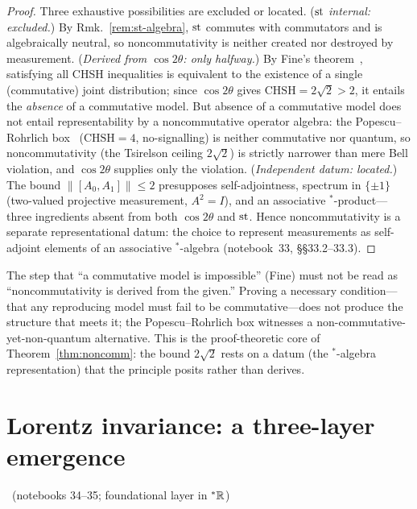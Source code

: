 \documentclass[11pt]{article}
\begin{document}
\begin{proof}
Three exhaustive possibilities are excluded or located. (\emph{$\operatorname{st}$ internal: excluded.}) By
Rmk.~\ref{rem:st-algebra}, $\operatorname{st}$ commutes with commutators and is algebraically neutral, so
noncommutativity is neither created nor destroyed by measurement. (\emph{Derived from
$\cos2\theta$: only halfway.}) By Fine's theorem~\cite{fine}, satisfying all CHSH inequalities is equivalent
to the existence of a single (commutative) joint distribution; since $\cos2\theta$ gives
$\text{CHSH}=2\sqrt2>2$, it entails the \emph{absence} of a commutative model. But absence of a
commutative model does not entail representability by a noncommutative operator algebra: the
Popescu--Rohrlich box~\cite{pr} ($\text{CHSH}=4$, no-signalling) is neither commutative nor quantum, so
noncommutativity (the Tsirelson ceiling $2\sqrt2$) is strictly narrower than mere Bell
violation, and $\cos2\theta$ supplies only the violation. (\emph{Independent datum: located.})
The bound $\|[A_0,A_1]\|\le2$ presupposes self-adjointness, spectrum in $\{\pm1\}$ (two-valued
projective measurement, $A^2=I$), and an associative ${}^{*}$-product---three ingredients absent
from both $\cos2\theta$ and $\operatorname{st}$. Hence noncommutativity is a separate representational datum:
the choice to represent measurements as self-adjoint elements of an associative ${}^{*}$-algebra
(notebook~33, \S\S33.2--33.3).
\end{proof}

\begin{remark}\label{rem:nec}
The step that ``a commutative model is impossible'' (Fine) must not be read as ``noncommutativity
is derived from the given.'' Proving a necessary condition---that any reproducing model must fail
to be commutative---does not produce the structure that meets it; the Popescu--Rohrlich box
witnesses a non-commutative-yet-non-quantum alternative. This is the proof-theoretic core of
Theorem~\ref{thm:noncomm}: the bound $2\sqrt2$ rests on a datum (the ${}^{*}$-algebra
representation) that the principle posits rather than derives.
\end{remark}

\section{Lorentz invariance: a three-layer emergence}\label{sec:lorentz}
\established\ (notebooks 34--35; foundational layer in \texorpdfstring{${}^{*}\mathbb{R}$}{*R})
\end{document}
